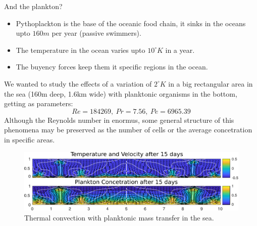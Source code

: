 \documentclass[final]{beamer}
\newlength{\onecolwid}
\begin{document}
\begin{frame}[t]
\begin{columns}[t]
\begin{column}{\onecolwid}

\begin{block}{And the plankton?}
	\begin{itemize}
		\item Pythoplackton is the base of the oceanic food chain, it sinks in the oceans upto $160 m$ per year (passive swimmers).
		\item The temperature in the ocean varies upto $10^{\circ}K$ in a year.
		\item The buyency forces keep them it specific regions in the ocean.
	\end{itemize}
	We wanted to study the effects of a variation of $2^{\circ}K$ in a big rectangular area in the sea (160m deep, 1.6km wide) with planktonic organisms in the bottom, getting as parameters:
	$$Re=184269, \: Pr=7.56, \: Pe=6965.39$$
	Although the Reynolds number in enormus, some general structure of this phenomena may be preserved as the number of cells or the average concetration in specific areas.
	
\begin{figure}
\includegraphics[width=1.0\linewidth]{images/planktonSim.pdf}
\caption{Thermal convection with planktonic mass transfer in the sea.}
\end{figure}

\end{block}




\end{column}
\end{columns}
\end{frame}
\end{document}
